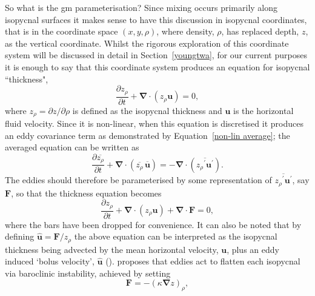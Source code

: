\documentclass[12pt,a4paper]{report}
\newcommand*\mean[1]{\overline{#1}}
\newcommand*\res[1]{{#1}^{\prime}}
\newcommand*\equref[1]{Equation~\eqref{#1}}
\newcommand*\secref[1]{Section~\ref{#1}}
\begin{document}
 So what is the \gls{gm} parameterisation? Since mixing occurs primarily
 along isopycnal surfaces it makes sense to have this discussion in
 isopycnal coordinates, that is in the coordinate space $(x,y,\rho)$,
  where density, $\rho$, has replaced depth, $z$, as the vertical
  coordinate. Whilst the rigorous exploration of this coordinate system
  will be discussed in detail in \secref{youngtwa}, for our current purposes 
  it is enough to say that this coordinate system produces an equation
  for isopycnal ``thickness",
  \begin{equation}
  \label{cont}
  \frac{\partial z_{\rho}}{\partial t} + \boldsymbol{\nabla}\cdot\left(z_{\rho}\boldsymbol{u}\right) = 0,
  \end{equation}
  where $z_{\rho} = {\partial z}/{\partial \rho}$ is defined as the
   isopycnal thickness and $\boldsymbol{u}$ is the horizontal fluid
   velocity. Since it is non-linear, when this equation is discretised
   it produces an eddy covariance term as demonstrated by 
   \equref{non-lin average}; the averaged equation can be written as
     \begin{equation}
     \frac{\partial \mean{z_{\rho}}}{\partial t} + \boldsymbol{\nabla}\cdot\left(\mean{z_{\rho}} \, \mean{\boldsymbol{u}}\right) = - \boldsymbol{\nabla}\cdot\left(\mean{\res{z_{\rho}} \res{\boldsymbol{u}}}\right).
     \label{meancont}
     \end{equation}
   The eddies should therefore be parameterised by some representation
   of $\mean{\res{z_{\rho}} \res{\boldsymbol{u}}}$, say $\boldsymbol{F}$,
   so that the thickness equation becomes
     \begin{equation}
     \frac{\partial z_{\rho}}{\partial t} + \boldsymbol{\nabla}\cdot\left(z_{\rho}\boldsymbol{u}\right) + \boldsymbol{\nabla}\cdot\boldsymbol{F} = 0,
     \label{thicknessgeneralparam}
     \end{equation}
    where the bars have been dropped for convenience. It can also 
    be noted that by defining $\hat{\boldsymbol{u}} = \boldsymbol{F}/z_{\rho}$ the above equation can be interpreted as
    the isopycnal thickness
    being advected by the mean horizontal velocity, $\boldsymbol{u}$, 
    plus an eddy induced
    `bolus velocity', $\hat{\boldsymbol{u}}$ (\cite{gent1995parameterizing}). \cite{gent1990} proposes that eddies act to flatten each
    isopycnal via baroclinic instability, achieved by
    setting 
    \begin{equation}
    \boldsymbol{F} = - \left(\kappa
        \boldsymbol{\nabla} z \right)_{\rho},
    \end{equation}
\end{document}

